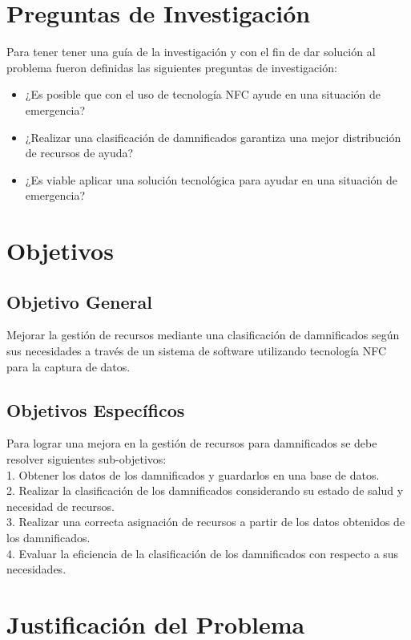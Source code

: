 \documentclass[11pt,openany]{book}
\newcounter{ns}
\begin{document}
	\section{Preguntas de Investigación}

	Para tener tener una guía de la investigación y con el fin de dar solución al problema fueron definidas las siguientes preguntas de investigación:

	\begin{itemize}
		\item ¿Es posible que con el uso de tecnología NFC ayude en una situación de emergencia?
		\item ¿Realizar una clasificación de damnificados garantiza una mejor distribución de recursos de ayuda?
		\item ¿Es viable aplicar una solución tecnológica para ayudar en una situación de emergencia?
	\end{itemize}
	\section{Objetivos}

	\subsection{Objetivo General}
	Mejorar la gestión de recursos mediante una clasificación de damnificados según sus necesidades a través de un sistema de software utilizando tecnología NFC para la captura de datos.
	\subsection{Objetivos Específicos}
	Para lograr una mejora en la gestión de recursos para damnificados se debe resolver siguientes sub-objetivos:\\
	1. Obtener los datos de los damnificados y guardarlos en una base de datos.\\
	2. Realizar la clasificación de los damnificados considerando su estado de salud y necesidad de recursos.\\
	3. Realizar una correcta asignación de recursos a partir de los datos obtenidos de los damnificados.\\
	4. Evaluar la eficiencia de la clasificación de los damnificados con respecto a sus necesidades.\\

	\section{Justificación del Problema}
\end{document}
